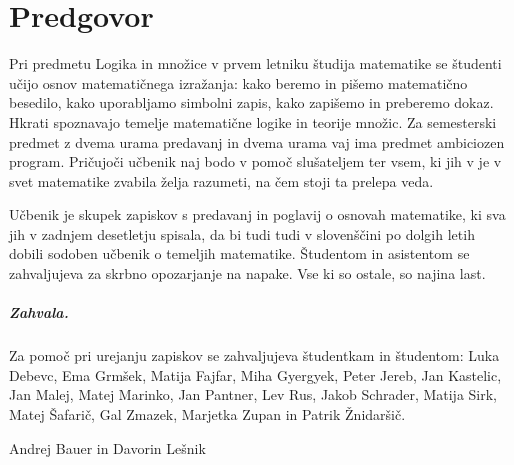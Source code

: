 \chapter*{Predgovor}
\label{chap:predgovor}

Pri predmetu Logika in množice v prvem letniku študija matematike se študenti
učijo osnov matematičnega izražanja: kako beremo in pišemo matematično besedilo, kako
uporabljamo simbolni zapis, kako zapišemo in preberemo dokaz.
%
Hkrati spoznavajo temelje matematične logike in teorije množic.
%
Za semesterski predmet z dvema urama predavanj in dvema urama vaj ima predmet ambiciozen program.
Pričujoči učbenik naj bodo v pomoč slušateljem ter vsem, ki jih v je v svet matematike zvabila želja razumeti, na čem stoji ta prelepa veda.

Učbenik je skupek zapiskov s predavanj in poglavij o osnovah matematike, ki sva jih v zadnjem desetletju spisala, da bi tudi tudi v slovenščini po dolgih letih dobili sodoben učbenik o temeljih matematike.
%
Študentom in asistentom se zahvaljujeva za skrbno opozarjanje na napake. Vse ki so ostale, so najina last.

\paragraph{Zahvala.}
%
Za pomoč pri urejanju zapiskov se zahvaljujeva študentkam in študentom:
%
Luka Debevc,
Ema Grmšek,
Matija Fajfar,
Miha Gyergyek,
Peter Jereb,
Jan Kastelic,
Jan Malej,
Matej Marinko,
Jan Pantner,
Lev Rus,
Jakob Schrader,
Matija Sirk,
Matej Šafarič,
Gal Zmazek,
Marjetka Zupan in Patrik Žnidaršič.

\bigskip

\begin{flushright}
Andrej Bauer in Davorin Lešnik
\end{flushright}

\bigskip


